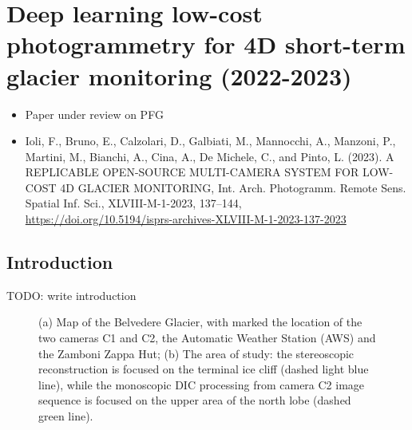 \graphicspath{{figures/chapter4/}}

\chapter{Deep learning low-cost photogrammetry for 4D short-term glacier monitoring
  (2022-2023)}

\vfill


\begin{itemize}
  \item Paper under review on PFG
  \item Ioli, F., Bruno, E., Calzolari, D., Galbiati, M., Mannocchi, A., Manzoni, P.,
        Martini, M., Bianchi, A., Cina, A., De Michele, C., and Pinto, L. (2023). A
        REPLICABLE
        OPEN-SOURCE MULTI-CAMERA SYSTEM FOR LOW-COST 4D GLACIER MONITORING, Int. Arch.
        Photogramm. Remote Sens. Spatial Inf. Sci., XLVIII-M-1-2023, 137–144, \\
        \url{https://doi.org/10.5194/isprs-archives-XLVIII-M-1-2023-137-2023}
\end{itemize}

\newpage

\section{Introduction}\label{sec:4:introduction}

{\color{red} TODO: write introduction}

\begin{figure}
  \centering
  \caption{(a) Map of the Belvedere Glacier, with marked the location of the two cameras
    C1 and C2, the Automatic Weather Station (AWS) and the Zamboni Zappa Hut;
    (b) The area of study: the stereoscopic reconstruction is focused on the terminal ice
    cliff (dashed light blue line), while the monoscopic DIC processing from camera C2
    image sequence is focused on the upper area of the north lobe (dashed green line).}
  \label{fig:4:studyarea}
\end{figure}

